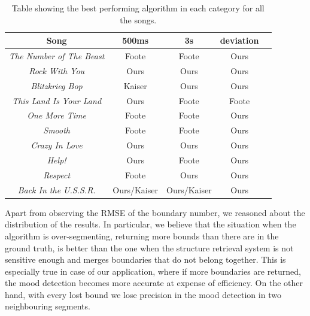 \begin{table}
\begin{center}
\begin{tabular}{| c | c | c | c | c | } \hline 
Song  											& 	500ms 			&  3s						&  deviation	\\ \hline \hline
\textit{The Number of The Beast} 	&	Foote			& 	Foote  				&  Ours 			\\ \hline
\textit{Rock With You}						&	Ours				&  Ours			  		&  Ours			\\ \hline
\textit{Blitzkrieg Bop} 						&	Kaiser			&  Ours  				&  Ours 			\\ \hline
\textit{This Land Is Your Land} 		&	Ours				&  Foote			  	&  Foote 		\\ \hline
\textit{One More Time}					&	Foote			&  Foote    				&  Ours 			\\ \hline
\textit{Smooth}								&	Foote			&  Foote  				&  Ours 			\\ \hline
\textit{Crazy In Love}						&	Ours				&  Ours  				&  Ours  		\\ \hline
\textit{Help!}									&	Ours				&  Foote		   		&  Ours 			\\ \hline
\textit{Respect}								&	Foote			&  Ours  				&  Ours 			\\ \hline
\textit{Back In the U.S.S.R.}				&	Ours/Kaiser	&  Ours/Kaiser 		&  Ours		    	\\ \hline

\end{tabular}
\caption{Table showing the best performing algorithm in each category for all the songs.}
\label{table:evalStructureRank}
\end{center}
\end{table}


Apart from observing the RMSE of the boundary number, we reasoned about the distribution of the results. In particular, we believe that the situation when the algorithm is over-segmenting, returning more bounds than there are in the ground truth, is better than the one when the structure retrieval system is not sensitive enough and merges boundaries that do not belong together. This is especially true in case of our application, where if more boundaries are returned, the mood detection becomes more accurate at expense of efficiency. On the other hand, with every lost bound we lose precision in the mood detection in two neighbouring segments.

